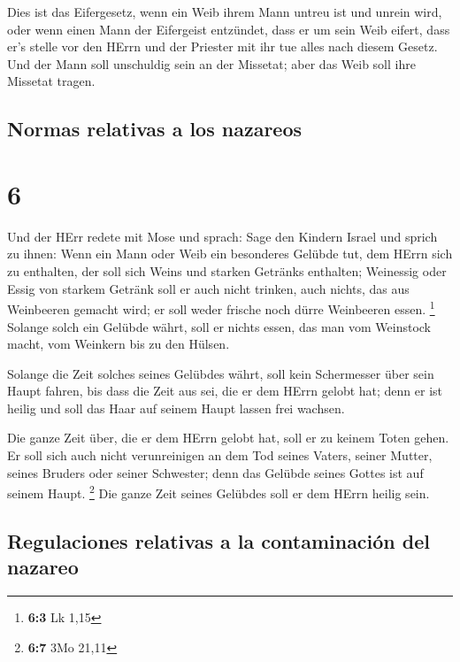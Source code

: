  Dies ist das Eifergesetz, wenn ein Weib ihrem Mann
untreu ist und unrein wird,  oder wenn einen Mann der
Eifergeist entzündet, dass er um sein Weib eifert, dass er's stelle vor
den HErrn und der Priester mit ihr tue alles nach diesem Gesetz.
 Und der Mann soll unschuldig sein an der Missetat; aber
das Weib soll ihre Missetat tragen.

\hypertarget{normas-relativas-a-los-nazareos}{%
\subsection{Normas relativas a los
nazareos}\label{normas-relativas-a-los-nazareos}}

\hypertarget{section-5}{%
\section{6}\label{section-5}}

 Und der HErr redete mit Mose und sprach: 
Sage den Kindern Israel und sprich zu ihnen: Wenn ein Mann oder Weib ein
besonderes Gelübde tut, dem HErrn sich zu enthalten,  der
soll sich Weins und starken Getränks enthalten; Weinessig oder Essig von
starkem Getränk soll er auch nicht trinken, auch nichts, das aus
Weinbeeren gemacht wird; er soll weder frische noch dürre Weinbeeren
essen. \footnote{\textbf{6:3} Lk 1,15}  Solange solch ein
Gelübde währt, soll er nichts essen, das man vom Weinstock macht, vom
Weinkern bis zu den Hülsen.

 Solange die Zeit solches seines Gelübdes währt, soll kein
Schermesser über sein Haupt fahren, bis dass die Zeit aus sei, die er
dem HErrn gelobt hat; denn er ist heilig und soll das Haar auf seinem
Haupt lassen frei wachsen.

 Die ganze Zeit über, die er dem HErrn gelobt hat, soll er
zu keinem Toten gehen.  Er soll sich auch nicht
verunreinigen an dem Tod seines Vaters, seiner Mutter, seines Bruders
oder seiner Schwester; denn das Gelübde seines Gottes ist auf seinem
Haupt. \footnote{\textbf{6:7} 3Mo 21,11}  Die ganze Zeit
seines Gelübdes soll er dem HErrn heilig sein.

\hypertarget{regulaciones-relativas-a-la-contaminaciuxf3n-del-nazareo}{%
\subsection{Regulaciones relativas a la contaminación del
nazareo}\label{regulaciones-relativas-a-la-contaminaciuxf3n-del-nazareo}}

